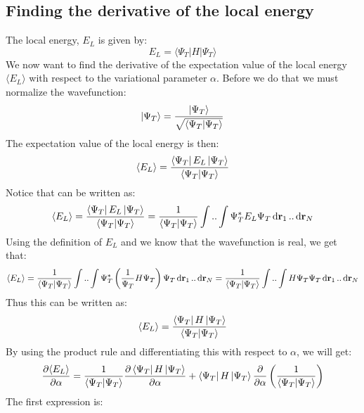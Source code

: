 \documentclass[a4paper, 10pt]{article}
\begin{document}
\begin{appendices}
		\section{Finding the derivative of the local energy}\label{ap:derivative_of_local_energy}
		The local energy, $E_L$ is given by:
		\begin{equation}
		E_L=\langle \Psi_T | H| \Psi_T \rangle
		\end{equation}
		We now want to find the derivative of the expectation value of the local energy $\langle E_{L}\rangle$
		with respect to the variational parameter $\alpha$. Before we do that we must normalize the wavefunction:
		\begin{align}
		\ket{\Psi_{T}} = \frac{\ket{\Psi_{T}}}{\sqrt{\braket{\Psi_{T}}}}
		\end{align}
		The expectation value of the local energy is then:
		\begin{align}
		\langle E_{L} \rangle = \frac{\bra{\Psi_{T}}E_{L}\ket{\Psi_{T}}}{\braket{\Psi_{T}}}
		\end{align}
		Notice that can be written as:
		\begin{align}
		\langle E_{L} \rangle = \frac{\bra{\Psi_{T}}E_{L}\ket{\Psi_{T}}}{\braket{\Psi_{T}}}
		= \frac{1}{\braket{\Psi_{T}}}\int..\int \Psi_{T}^{*}E_{L}\Psi_{T}\dd{\bold{r}_{1}}..\dd{\bold{r}_{N}}
		\end{align}
		Using the definition of $E_{L}$ and we know that the wavefunction is real, we get that:
		\begin{align}
		\langle E_{L} \rangle = \frac{1}{\braket{\Psi_{T}}}\int..\int \Psi_{T}^{*}\left(\frac{1}{\Psi_{T}}H\Psi_{T}\right)\Psi_{T}\dd{\bold{r}_{1}}..\dd{\bold{r}_{N}}
		= \frac{1}{\braket{\Psi_{T}}}\int..\int H\Psi_{T}\Psi_{T}\dd{\bold{r}_{1}}..\dd{\bold{r}_{N}}
		\end{align}
		Thus this can be written as:
		\begin{align}
		\langle E_{L} \rangle = \frac{\bra{\Psi_{T}}H\ket{\Psi_{T}}}{\braket{\Psi_{T}}}
		\end{align}
		By using the product rule and differentiating this with respect to $\alpha$,
		we will get:
		\begin{align}
		\pdv{\langle E_{L} \rangle }{\alpha} = \frac{1}{\braket{\Psi_{T}}}\pdv{\bra{\Psi_{T}}H\ket{\Psi_{T}}}{\alpha}
		+ \bra{\Psi_{T}}H\ket{\Psi_{T}}\pdv{\alpha}\left(\frac{1}{\braket{\Psi_{T}}}\right)
		\label{proddiff}
		\end{align}
		The first expression is:
		\begin{align}

\end{align}
\end{appendices}
\end{document}
